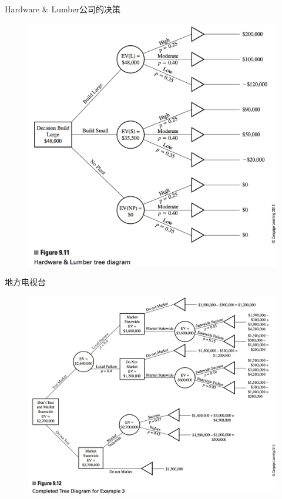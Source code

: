 \documentclass[mathserif, table]{beamer}
\begin{document}
\begin{frame}{Hardware \& Lumber公司的决策}
  
  \begin{figure}
    \centering
    \includegraphics[height=0.8\textheight{}]{9_11.png}
  \end{figure}

\end{frame}

\begin{frame}{地方电视台}
  
  \begin{figure}
    \centering
    \includegraphics[height=0.8\textheight{}]{9_12.png}
  \end{figure}

\end{frame}
\end{document}
